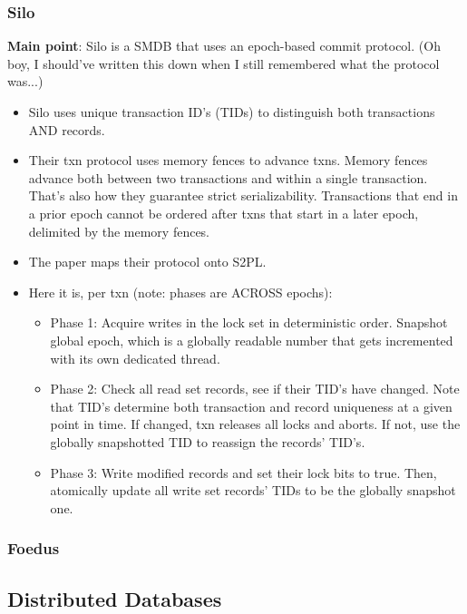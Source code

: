 \subsubsection{Silo}
\textbf{Main point}: Silo \cite{silo} is a SMDB that uses an epoch-based commit protocol. (Oh boy, I should've written this down when I still remembered what the protocol was...)
\begin{itemize}
    \item Silo uses unique transaction ID's (TIDs) to distinguish both transactions AND records. 
    \item Their txn protocol uses memory fences to advance txns. Memory fences advance both between two transactions and within a single transaction. That's also how they guarantee strict serializability. Transactions that end in a prior epoch cannot be ordered after txns that start in a later epoch, delimited by the memory fences.
    \item The paper maps their protocol onto S2PL.
    \item Here it is, per txn (note: phases are ACROSS epochs):
    \begin{itemize}
        \item Phase 1: Acquire writes in the lock set in deterministic order. Snapshot global epoch, which is a globally readable number that gets incremented with its own dedicated thread.
        \item Phase 2: Check all read set records, see if their TID's have changed. Note that TID's determine both transaction and record uniqueness at a given point in time. If changed, txn releases all locks and aborts. If not, use the globally snapshotted TID to reassign the records' TID's.
        \item Phase 3: Write modified records and set their lock bits to true. Then, atomically update all write set records' TIDs to be the globally snapshot one.
    \end{itemize}
\end{itemize}
\subsubsection{Foedus}
\cite{foedus}

\subsection{Distributed Databases}
